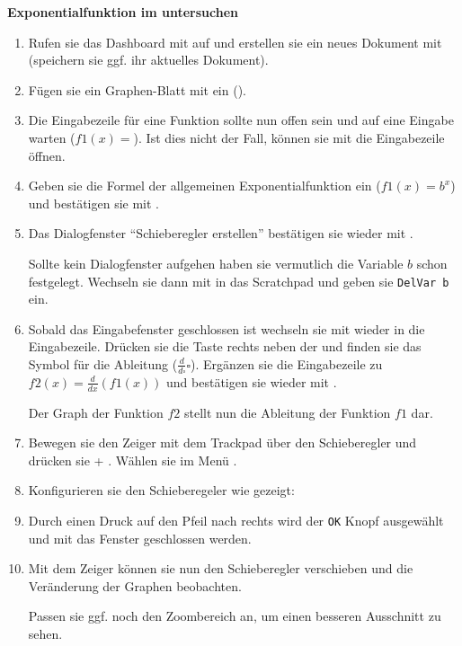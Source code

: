 \documentclass[10pt, a4paper]{scrartcl}
\begin{document}
	\newpage
	\textbf{Exponentialfunktion im \TIN untersuchen}\\
		\begin{enumerate}
			\item Rufen sie das Dashboard mit \TINon* auf und erstellen sie ein neues Dokument mit  (speichern sie ggf. ihr aktuelles Dokument).
			\item Fügen sie ein Graphen-Blatt mit  ein ().
			\item Die Eingabezeile für eine Funktion sollte nun offen sein und auf eine Eingabe warten ($f1(x)=$). Ist dies nicht der Fall, können sie mit \TINtab die Eingabezeile öffnen.
			\item Geben sie die Formel der allgemeinen Exponentialfunktion ein ($f1(x) = b^x$) und bestätigen sie mit \TINenter*.
			\item Das Dialogfenster \enquote{Schieberegler erstellen} bestätigen sie wieder mit \TINenter*.
			
			Sollte kein Dialogfenster aufgehen haben sie vermutlich die Variable $b$ schon festgelegt. Wechseln sie dann mit \TINscratch* in das Scratchpad und geben sie \texttt{DelVar b} ein.
			\item Sobald das Eingabefenster geschlossen ist wechseln sie mit \TINtab wieder in die Eingabezeile. Drücken sie die Taste rechts neben der  und finden sie das Symbol für die Ableitung ($\tfrac{d}{d\square}\square$). Ergänzen sie die Eingabezeile zu $f2(x) = \tfrac{d}{dx}(f1(x))$ und bestätigen sie wieder mit \TINenter*.
			
			Der Graph der Funktion $f2$ stellt nun die Ableitung der Funktion $f1$ dar.
			\item Bewegen sie den Zeiger mit dem Trackpad über den Schieberegler und drücken sie \TINctrl + \TINmenu*. Wählen sie im Menü .
			\item Konfigurieren sie den Schieberegeler wie gezeigt:
			
				\begin{center}
					\begin{tinwin}
					\end{tinwin}
				\end{center}
			\item Durch einen Druck auf den Pfeil nach rechts wird der \texttt{OK} Knopf ausgewählt und mit \TINenter* das Fenster geschlossen werden.
			\item Mit dem Zeiger können sie nun den Schieberegler verschieben und die Veränderung der Graphen beobachten. 
			
			Passen sie ggf. noch den Zoombereich an, um einen besseren Ausschnitt zu sehen.
		\end{enumerate}
	
\end{document}
